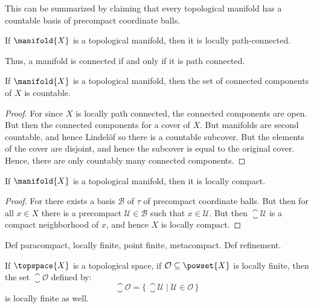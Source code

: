             This can be summarized by claiming that every topological manifold
            has a countable basis of precompact coordinate balls.
            \begin{theorem}
                If $\manifold{X}$ is a topological manifold, then it is
                locally path-connected.
            \end{theorem}
            Thus, a manifold is connected if and only if it is path connected.
            \begin{theorem}
                If $\manifold{X}$ is a topological manifold, then the set of
                connected components of $X$ is countable.
            \end{theorem}
            \begin{proof}
                For since $X$ is locally path connected, the connected
                components are open. But then the connected components for a
                cover of $X$. But manifolds are second countable, and hence
                Lindel\"{o}f so there is a countable subcover. But the elements
                of the cover are disjoint, and hence the subcover is equal to
                the original cover. Hence, there are only countably many
                connected components.
            \end{proof}
            \begin{theorem}
                If $\manifold{X}$ is a topological manifold, then it is locally
                compact.
            \end{theorem}
            \begin{proof}
                For there exists a basis $\mathcal{B}$ of $\tau$ of precompact
                coordinate balls. But then for all $x\in{X}$ there is a
                precompact $\mathcal{U}\in\mathcal{B}$ such that
                $x\in\mathcal{U}$. But then $\closure{\mathcal{U}}$ is a compact
                neighborhood of $x$, and hence $X$ is locally compact.
            \end{proof}
            Def paracompact, locally finite, point finite, metacompact.
            Def refinement.
            \begin{theorem}
                If $\topspace{X}$ is a topological space, if
                $\mathcal{O}\subseteq\powset{X}$ is locally finite, then the
                set $\closure{\mathcal{O}}$ defined by:
                \begin{equation}
                    \closure{\mathcal{O}}=
                        \{\,\closure{\mathcal{U}}\;|\;
                        \mathcal{U}\in\mathcal{O}\,\}
                \end{equation}
                is locally finite as well.
            \end{theorem}
